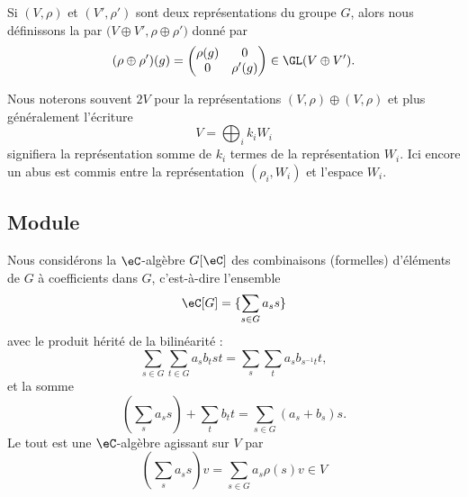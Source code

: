 \begin{definition}
    Si \( (V,\rho)\) et \( (V',\rho')\) sont deux représentations du groupe \( G\), alors nous définissons la  par \( \big( V\oplus V',\rho\oplus\rho' \big)\) donné par
    \begin{equation}
        (\rho\oplus\rho')(g)=\begin{pmatrix}
            \rho(g) & 0        \\
            0       & \rho'(g)
        \end{pmatrix}\in \GL(V\oplus V').
    \end{equation}
\end{definition}

Nous noterons souvent \( 2V\) pour la représentations \( (V,\rho)\oplus (V,\rho)\) et plus généralement l'écriture
\begin{equation}
	V=\bigoplus_i k_iW_i
\end{equation}
signifiera la représentation somme de \( k_i\) termes de la représentation \( W_i\). Ici encore un abus est commis entre la représentation \( (\rho_i,W_i)\) et l'espace \( W_i\).

\subsection{Module}

Nous considérons la \( \eC\)-algèbre \( G[\eC]\) des combinaisons (formelles) d'éléments de \( G\) à coefficients dans \( G\), c'est-à-dire l'ensemble
\begin{equation}
	\eC[G]=\{ \sum_{s\in G}a_ss \}
\end{equation}
avec le produit hérité de la bilinéarité :
\begin{equation}
	\sum_{s\in G}\sum_{t\in G}a_sb_tst=\sum_s\sum_t a_sb_{s^{-1}t}t,
\end{equation}
et la somme
\begin{equation}
	(\sum_sa_ss)+\sum_tb_tt=\sum_{s\in G}(a_s+b_s)s.
\end{equation}
Le tout est une \( \eC\)-algèbre agissant sur \( V\) par
\begin{equation}
	\left( \sum_sa_ss \right)v=\sum_{s\in G}a_s\rho(s)v\in V
\end{equation}

